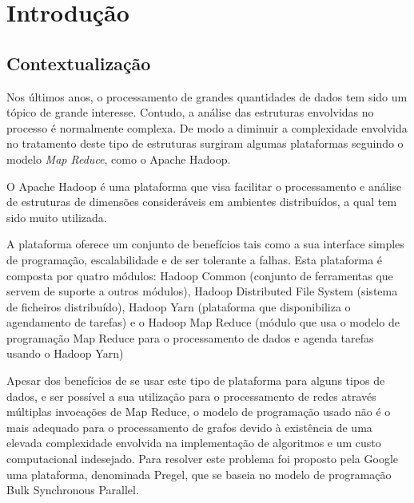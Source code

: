 \chapter{Introdução}

\section{Contextualização}
Nos últimos anos, o processamento de grandes quantidades de dados tem sido um tópico de grande interesse. Contudo, a análise das estruturas envolvidas no processo 
é normalmente complexa. De modo a diminuir a complexidade envolvida no tratamento deste tipo de estruturas surgiram algumas plataformas seguindo o modelo \textit{Map Reduce}, como o Apache Hadoop\cite{hadoop}.

O Apache Hadoop\cite{hadoop} é uma plataforma que visa facilitar o processamento e análise de estruturas de dimensões consideráveis em ambientes distribuídos, a qual tem sido muito utilizada.

A plataforma oferece um conjunto de benefícios tais como a sua interface simples de programação, escalabilidade e de ser tolerante a falhas.
Esta plataforma é composta por quatro módulos:
Hadoop Common (conjunto de ferramentas que servem de suporte a outros módulos),
Hadoop Distributed File System (sistema de ficheiros distribuído),
Hadoop Yarn (plataforma que disponibiliza o agendamento de tarefas)
e o Hadoop Map Reduce (módulo que usa o modelo de programação Map Reduce para o processamento de dados e agenda tarefas usando o Hadoop Yarn)

Apesar dos benefícios de se usar este tipo de plataforma para alguns tipos de dados, e ser possível a sua utilização para o processamento de redes através múltiplas invocações de Map Reduce, o modelo de programação usado  não é o mais adequado para o processamento de grafos devido à existência de  uma elevada complexidade envolvida na implementação de algoritmos e um custo computacional indesejado.
Para resolver este problema foi proposto pela Google uma plataforma, denominada Pregel\cite{pregel}, que se baseia no modelo de programação Bulk Synchronous Parallel\cite{bsp}.

